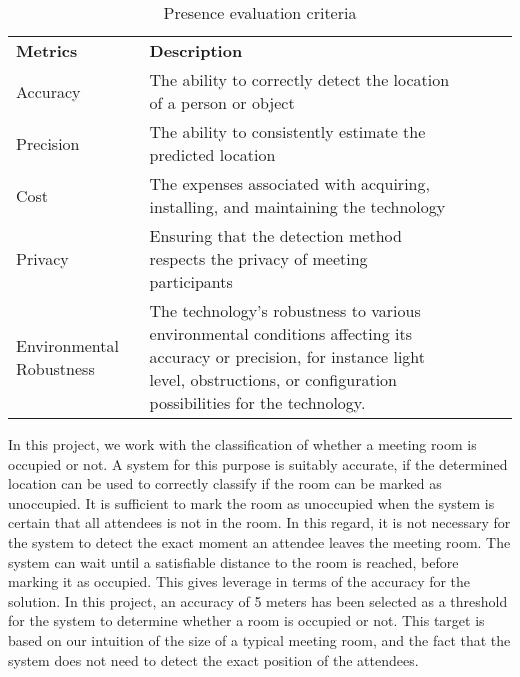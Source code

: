 \begin{table}[H]
    \begin{tabular}{|l|p{85mm}|lll}
    \cline{1-2}
    \textbf{Metrics} & \textbf{Description} &  &  &  \\ \cline{1-2}
    Accuracy         & The ability to correctly detect the location of a person or object &  &  &  \\ \cline{1-2}
    Precision        & The ability to consistently estimate the predicted location                           &  &  &  \\ \cline{1-2}
    Cost             & The expenses associated with acquiring, installing, and maintaining the technology &  &  &  \\ \cline{1-2}
    Privacy          & Ensuring that the detection method respects the privacy of meeting participants    &  &  &  \\ \cline{1-2}
    Environmental Robustness    & The technology's robustness to various environmental conditions affecting its accuracy or precision, for instance light level, obstructions, or configuration possibilities for the technology.                     &  &  &  \\ \cline{1-2}
    \end{tabular}
    \caption{Presence evaluation criteria}
    \label{lst:presence_eval_criteria}
\end{table}

In this project, we work with the classification of whether a meeting room is occupied or not. 
A system for this purpose is suitably accurate, if the determined location can be used to correctly classify if the room can be marked as unoccupied.
It is sufficient to mark the room as unoccupied when the system is certain that all attendees is not in the room. 
In this regard, it is not necessary for the system to detect the exact moment an attendee leaves the meeting room.
The system can wait until a satisfiable distance to the room is reached, before marking it as occupied. 
This gives leverage in terms of the accuracy for the solution. 
In this project, an accuracy of 5 meters has been selected as a threshold for the system to determine whether a room is occupied or not. This target is based on our intuition of the size of a typical meeting room, and the fact that the system does not need to detect the exact position of the attendees.